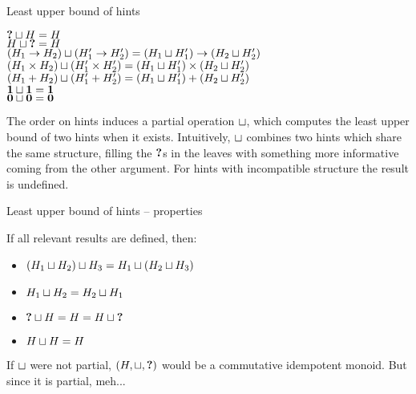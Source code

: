 \documentclass{beamer}
\begin{document}
\begin{frame}{Least upper bound of hints}

\begin{center}
  $\textbf{?} \sqcup H = H$ \\
  $H \sqcup \textbf{?} = H$ \\
  $(H_1 \to H_2) \sqcup (H'_1 \to H'_2) = (H_1 \sqcup H'_1) \to (H_2 \sqcup H'_2)$ \\
  $(H_1 \times H_2) \sqcup (H'_1 \times H'_2) = (H_1 \sqcup H'_1) \times (H_2 \sqcup H'_2)$ \\
  $(H_1 + H_2) \sqcup (H'_1 + H'_2) = (H_1 \sqcup H'_1) + (H_2 \sqcup H'_2)$ \\
  $\textbf{1} \sqcup \textbf{1} = \textbf{1}$ \\
  $\textbf{0} \sqcup \textbf{0} = \textbf{0}$
\end{center}

The order on hints induces a partial operation $\sqcup$, which computes the least upper bound of two hints when it exists. Intuitively, $\sqcup$ combines two hints which share the same structure, filling the $\textbf{?}$s in the leaves with something more informative coming from the other argument. For hints with incompatible structure the result is undefined.

\end{frame}

\begin{frame}{Least upper bound of hints -- properties}

If all relevant results are defined, then:

\begin{itemize}
  \item $(H_1 \sqcup H_2) \sqcup H_3 = H_1 \sqcup (H_2 \sqcup H_3)$
  \item $H_1 \sqcup H_2 = H_2 \sqcup H_1$
  \item $\textbf{?} \sqcup H = H = H \sqcup \textbf{?}$
  \item $H \sqcup H = H$
\end{itemize}

\vspace{2em}

If $\sqcup$ were not partial, $(H, \sqcup, \textbf{?})$ would be a commutative idempotent monoid. But since it is partial, meh...

\end{frame}
\end{document}
